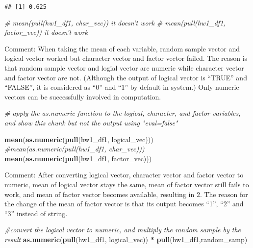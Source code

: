 \documentclass[]{article}
\newenvironment{Shaded}{\begin{snugshade}}{\end{snugshade}}
\newcommand{\CommentTok}[1]{\textcolor[rgb]{0.56,0.35,0.01}{\textit{#1}}}
\newcommand{\KeywordTok}[1]{\textcolor[rgb]{0.13,0.29,0.53}{\textbf{#1}}}
\newcommand{\NormalTok}[1]{#1}
\newcommand{\OperatorTok}[1]{\textcolor[rgb]{0.81,0.36,0.00}{\textbf{#1}}}
\newcommand{\StringTok}[1]{\textcolor[rgb]{0.31,0.60,0.02}{#1}}
\begin{document}
\begin{verbatim}
## [1] 0.625
\end{verbatim}

\begin{Shaded}
\begin{Highlighting}[]
\CommentTok{# mean(pull(hw1_df1, char_vec))    it doesn't work}
\CommentTok{# mean(pull(hw1_df1, factor_vec))  it doesn't work}
\end{Highlighting}
\end{Shaded}

Comment: When taking the mean of each variable, random sample vector and
logical vector worked but character vector and factor vector failed. The
reason is that random sample vector and logial vector are numeric while
character vector and factor vector are not. (Although the output of
logical vector is ``TRUE'' and ``FALSE'', it is considered as ``0'' and
``1'' by default in system.) Only numeric vectors can be successfully
involved in computation.

\begin{Shaded}
\begin{Highlighting}[]
\CommentTok{# apply the as.numeric function to the logical, character, and factor variables, and show this chunk but not the output using "eval=false"}

\KeywordTok{mean}\NormalTok{(}\KeywordTok{as.numeric}\NormalTok{(}\KeywordTok{pull}\NormalTok{(hw1_df1, logical_vec)))}
\CommentTok{#mean(as.numeric(pull(hw1_df1, char_vec)))}
\KeywordTok{mean}\NormalTok{(}\KeywordTok{as.numeric}\NormalTok{(}\KeywordTok{pull}\NormalTok{(hw1_df1, factor_vec)))}
\end{Highlighting}
\end{Shaded}

Comment: After converting logical vector, character vector and factor
vector to numeric, mean of logical vector stays the same, mean of factor
vector still fails to work, and mean of factor vector becomes available,
resulting in 2. The reason for the change of the mean of factor vector
is that its output becomes ``1'', ``2'' and ``3'' instead of string.

\begin{Shaded}
\begin{Highlighting}[]
\CommentTok{#convert the logical vector to numeric, and multiply the random sample by the result}
\KeywordTok{as.numeric}\NormalTok{(}\KeywordTok{pull}\NormalTok{(hw1_df1, logical_vec)) }\OperatorTok{*}\StringTok{ }\KeywordTok{pull}\NormalTok{(hw1_df1,random_samp)}
\end{Highlighting}
\end{Shaded}
\end{document}
